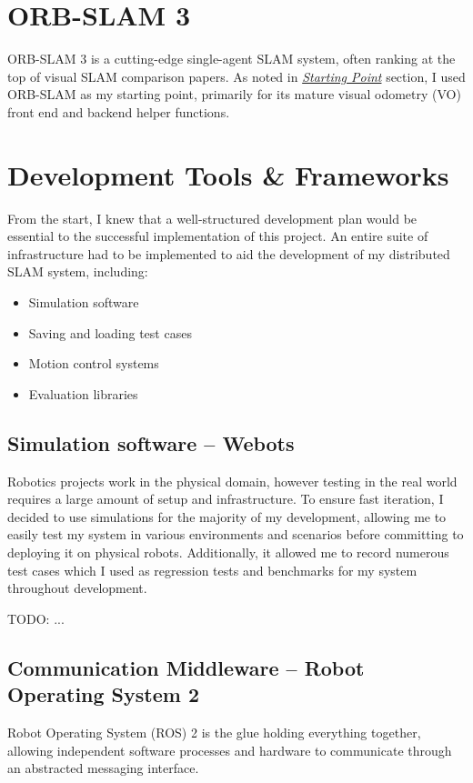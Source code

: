 \section{ORB-SLAM 3}
\label{sec:orb-slam-3}
ORB-SLAM 3 is a cutting-edge single-agent SLAM system, often ranking at the top of visual SLAM comparison papers. As noted in \hyperref[sec:starting-point]{\textit{Starting Point}} section, I used ORB-SLAM as my starting point, primarily for its mature visual odometry (VO) front end and backend helper functions.

\section{Development Tools \& Frameworks}
\label{sec:development-tools-and-frameworks}
From the start, I knew that a well-structured development plan would be essential to the successful implementation of this project. An entire suite of infrastructure had to be implemented to aid the development of my distributed SLAM system, including: \noparskip
{
    \begin{itemize}[nosep]
        \item Simulation software
        \item Saving and loading test cases
        \item Motion control systems
        \item Evaluation libraries
    \end{itemize}
}

\subsection{Simulation software – Webots}
\label{sec:webots-simulator}

Robotics projects work in the physical domain, however testing in the real world requires a large amount of setup and infrastructure. To ensure fast iteration, I decided to use simulations for the majority of my development, allowing me to easily test my system in various environments and scenarios before committing to deploying it on physical robots. Additionally, it allowed me to record numerous test cases which I used as regression tests and benchmarks for my system throughout development.

TODO: ...


\subsection{Communication Middleware – Robot Operating System 2}
\label{sec:ros-2}
Robot Operating System (ROS) 2 is the glue holding everything together, allowing independent software processes and hardware to communicate through an abstracted messaging interface.

